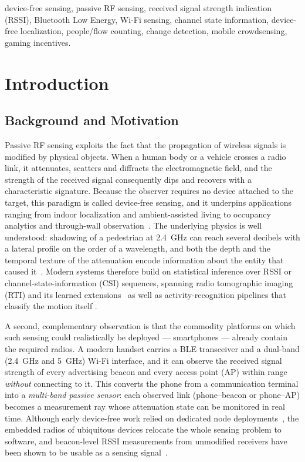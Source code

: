 \documentclass[journal,10pt]{IEEEtran}
\begin{document}
\begin{IEEEkeywords}
device-free sensing, passive RF sensing, received signal strength indication
(RSSI), Bluetooth Low Energy, Wi-Fi sensing, channel state information,
device-free localization, people/flow counting, change detection, mobile
crowdsensing, gaming incentives.
\end{IEEEkeywords}

\section{Introduction}
\subsection{Background and Motivation}
Passive RF sensing exploits the fact that the propagation of wireless signals
is modified by physical objects. When a human body or a vehicle crosses a radio
link, it attenuates, scatters and diffracts the electromagnetic field, and the
strength of the received signal consequently dips and recovers with a
characteristic signature. Because the observer requires no device attached to
the target, this paradigm is called device-free sensing, and it underpins
applications ranging from indoor localization and ambient-assisted living to
occupancy analytics and through-wall observation~\cite{wilson2010}. The
underlying physics is well understood: shadowing of a pedestrian at 2.4~GHz can
reach several decibels with a lateral profile on the order of a wavelength, and
both the depth and the temporal texture of the attenuation encode information
about the entity that caused it~\cite{januszkiewicz2018}. Modern systems
therefore build on statistical inference over RSSI or channel-state-information
(CSI) sequences, spanning radio tomographic imaging (RTI) and its learned
extensions~\cite{alippi2016,li2024,wu2024,cnnrti2025} as well as
activity-recognition pipelines that classify the motion itself
\cite{wong2024,sanchez2020}.

A second, complementary observation is that the commodity platforms on which
such sensing could realistically be deployed --- smartphones --- already
contain the required radios. A modern handset carries a BLE transceiver and a
dual-band (2.4~GHz and 5~GHz) Wi-Fi interface, and it can observe the received
signal strength of every advertising beacon and every access point (AP) within
range \emph{without} connecting to it. This converts the phone from a
communication terminal into a \emph{multi-band passive sensor}: each observed
link (phone--beacon or phone--AP) becomes a measurement ray whose attenuation
state can be monitored in real time. Although early device-free work relied on
dedicated node deployments~\cite{wilson2010,alippi2016}, the embedded radios of
ubiquitous devices relocate the whole sensing problem to software, and
beacon-level RSSI measurements from unmodified receivers have been shown to be
usable as a sensing signal~\cite{ramirez2021,milano2024,bai2020}.
\end{document}
